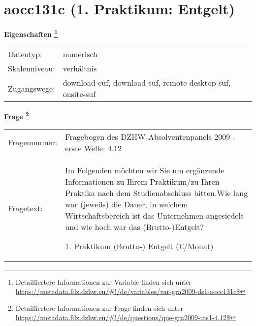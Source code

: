 
    \setcounter{footnote}{0}

    \vspace*{-1.8cm}
	\section{aocc131c (1. Praktikum: Entgelt)}
	\label{section:aocc131c}



    \vspace*{0.5cm}
    \noindent\textbf{Eigenschaften
	\footnote{Detailliertere Informationen zur Variable finden sich unter
		\url{https://metadata.fdz.dzhw.eu/\#!/de/variables/var-gra2009-ds1-aocc131c$}}}\\
	\begin{tabularx}{\hsize}{@{}lX}
	Datentyp: & numerisch \\
	Skalenniveau: & verhältnis \\
	Zugangswege: &
	  download-cuf, 
	  download-suf, 
	  remote-desktop-suf, 
	  onsite-suf
 \\
    \end{tabularx}



				\vspace*{0.5cm}
                \noindent\textbf{Frage
	                \footnote{Detailliertere Informationen zur Frage finden sich unter
		              \url{https://metadata.fdz.dzhw.eu/\#!/de/questions/que-gra2009-ins1-4.12$}}}\\
				\begin{tabularx}{\hsize}{@{}lX}
					Fragenummer: &
					  Fragebogen des DZHW-Absolventenpanels 2009 - erste Welle:
					  4.12
 \\
					Fragetext: & Im Folgenden möchten wir Sie um ergänzende Informationen zu Ihrem Praktikum/zu Ihren Praktika nach dem Studienabschluss bitten.Wie lang war (jeweils) die Dauer, in welchem Wirtschaftsbereich ist das Unternehmen angesiedelt und wie hoch war das (Brutto-)Entgelt?\par  1. Praktikum (Brutto-) Entgelt (€/Monat) \\
				\end{tabularx}





